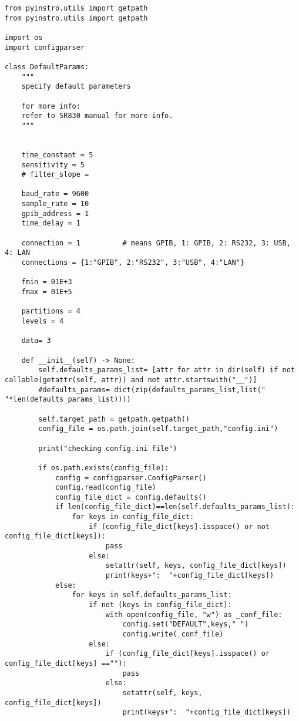\begin{verbatim}
from pyinstro.utils import getpath
from pyinstro.utils import getpath

import os
import configparser

class DefaultParams:
    """
    specify default parameters
    
    for more info:
    refer to SR830 manual for more info.
    """


    time_constant = 5
    sensitivity = 5
    # filter_slope = 

    baud_rate = 9600
    sample_rate = 10
    gpib_address = 1
    time_delay = 1

    connection = 1          # means GPIB, 1: GPIB, 2: RS232, 3: USB, 4: LAN
    connections = {1:"GPIB", 2:"RS232", 3:"USB", 4:"LAN"}

    fmin = 01E+3
    fmax = 01E+5
    
    partitions = 4
    levels = 4

    data= 3

    def __init__(self) -> None:
        self.defaults_params_list= [attr for attr in dir(self) if not callable(getattr(self, attr)) and not attr.startswith("__")]
        #defaults_params= dict(zip(defaults_params_list,list(" "*len(defaults_params_list))))
        
        self.target_path = getpath.getpath()
        config_file = os.path.join(self.target_path,"config.ini")

        print("checking config.ini file")
        
        if os.path.exists(config_file):
            config = configparser.ConfigParser()
            config.read(config_file)
            config_file_dict = config.defaults()
            if len(config_file_dict)==len(self.defaults_params_list):
                for keys in config_file_dict:
                    if (config_file_dict[keys].isspace() or not config_file_dict[keys]):
                        pass
                    else:
                        setattr(self, keys, config_file_dict[keys])
                        print(keys+":  "+config_file_dict[keys])
            else:
                for keys in self.defaults_params_list:
                    if not (keys in config_file_dict):
                        with open(config_file, "w") as _conf_file: 
                            config.set("DEFAULT",keys," ")
                            config.write(_conf_file) 
                    else:
                        if (config_file_dict[keys].isspace() or config_file_dict[keys] ==""):
                            pass
                        else:
                            setattr(self, keys, config_file_dict[keys])
                            print(keys+":  "+config_file_dict[keys])
                            

\end{verbatim}
